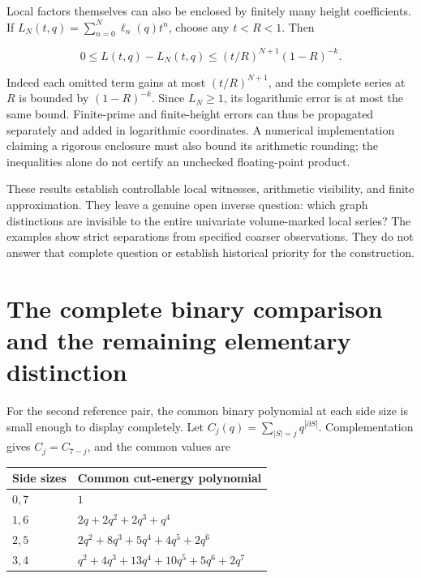 \documentclass[
  11pt,
  a4paper,
]{report}
\begin{document}
Local factors themselves can also be enclosed by finitely many height
coefficients. If \(L_N(t,q)=\sum_{n=0}^N\ell_n(q)t^n\), choose any
\(t<R<1\). Then

\[
 0\le L(t,q)-L_N(t,q)
 \le (t/R)^{N+1}(1-R)^{-k}.
 \tag{7.14}
\]

Indeed each omitted term gains at most \((t/R)^{N+1}\), and the complete
series at \(R\) is bounded by \((1-R)^{-k}\). Since \(L_N\ge1\), its
logarithmic error is at most the same bound. Finite-prime and
finite-height errors can thus be propagated separately and added in
logarithmic coordinates. A numerical implementation claiming a rigorous
enclosure must also bound its arithmetic rounding; the inequalities
alone do not certify an unchecked floating-point product.

These results establish controllable local witnesses, arithmetic
visibility, and finite approximation. They leave a genuine open inverse
question: which graph distinctions are invisible to the entire
univariate volume-marked local series? The examples show strict
separations from specified coarser observations. They do not answer that
complete question or establish historical priority for the construction.

\hypertarget{the-complete-binary-comparison-and-the-remaining-elementary-distinction}{%
\section{The complete binary comparison and the remaining elementary
distinction}\label{the-complete-binary-comparison-and-the-remaining-elementary-distinction}}

For the second reference pair, the common binary polynomial at each side
size is small enough to display completely. Let
\(C_j(q)=\sum_{|S|=j}q^{|\partial S|}\). Complementation gives
\(C_j=C_{7-j}\), and the common values are

\begin{longtable}[]{@{}ll@{}}
\toprule\noalign{}
Side sizes & Common cut-energy polynomial \\
\midrule\noalign{}
\endhead
\bottomrule\noalign{}
\endlastfoot
\(0,7\) & \(1\) \\
\(1,6\) & \(2q+2q^2+2q^3+q^4\) \\
\(2,5\) & \(2q^2+8q^3+5q^4+4q^5+2q^6\) \\
\(3,4\) & \(q^2+4q^3+13q^4+10q^5+5q^6+2q^7\) \\
\end{longtable}
\end{document}
